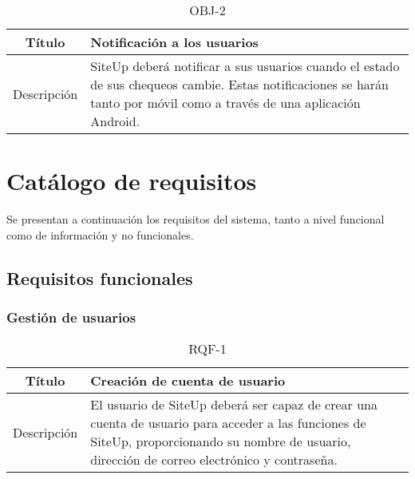 \begin{table}[h!]
  \centering
  \begin{tabularx}{\textwidth}{|c|X|}
    \hline
    Título & Notificación a los usuarios \\

    \hline

    Descripción & SiteUp deberá notificar a sus usuarios cuando el estado de sus
    chequeos cambie. Estas notificaciones se harán tanto por móvil como a través
    de una aplicación Android. \\

    \hline
  \end{tabularx}
  \caption{OBJ-2}
\end{table}

\section{Catálogo de requisitos}

Se presentan a continuación los requisitos del sistema, tanto a nivel funcional como de información y no funcionales.

\subsection{Requisitos funcionales}

\subsubsection{Gestión de usuarios}

\begin{table}[h!]
  \centering
  \begin{tabularx}{\textwidth}{|c|X|}
    \hline
    Título & Creación de cuenta de usuario \\

    \hline

    Descripción & El usuario de SiteUp deberá ser capaz de crear una cuenta de
    usuario para acceder a las funciones de SiteUp, proporcionando su nombre de
    usuario, dirección de correo electrónico y contraseña.\\

    \hline
  \end{tabularx}
  \caption{RQF-1}
\end{table}

